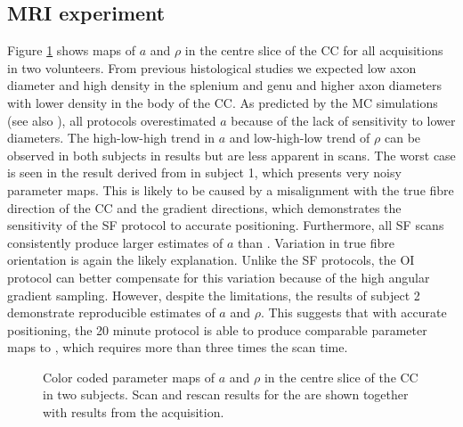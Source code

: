 \subsection{MRI experiment}
Figure \ref{fig:experiment4:maps} shows maps of $a$ and $\rho$ in the centre slice of the \gls{CC} for all acquisitions in two volunteers. From previous histological studies \cite{Aboitiz:1992} we expected low axon diameter and high density in the splenium and genu and higher axon diameters with lower density in the body of the \gls{CC}. As predicted by the MC simulations (see also \citet{Alexander:2010}), all protocols overestimated $a$ because of the lack of sensitivity to lower diameters. The high-low-high trend in $a$ and low-high-low trend of $\rho$ can be observed in both subjects in \OIlong{} results but are less apparent in \SFshort{} scans. The worst case is seen in the result derived from \SFshort{} in subject 1, which presents very noisy parameter maps. This is likely to be caused by a misalignment with the true fibre direction of the \gls{CC} and the gradient directions, which demonstrates the sensitivity of the SF protocol to accurate positioning. Furthermore, all SF scans consistently produce larger estimates of $a$ than \OIlong{}. Variation in true fibre orientation is again the likely explanation. Unlike the SF protocols, the OI protocol can better compensate for this variation because of the high angular gradient sampling. However, despite the limitations, the results of subject 2 demonstrate reproducible estimates of $a$ and $\rho$. This suggests that with accurate positioning, the 20 minute \SFshort{} protocol is able to produce comparable parameter maps to \OIlong, which requires more than three times the scan time.
\begin{figure}
 \centering
  \caption{Color coded parameter maps of $a$ and $\rho$ in the centre slice of the CC in two subjects. Scan and rescan results for the \SFshort{} are shown together with results from the \OIlong{} acquisition.}
  \label{fig:experiment4:maps}
\end{figure}
